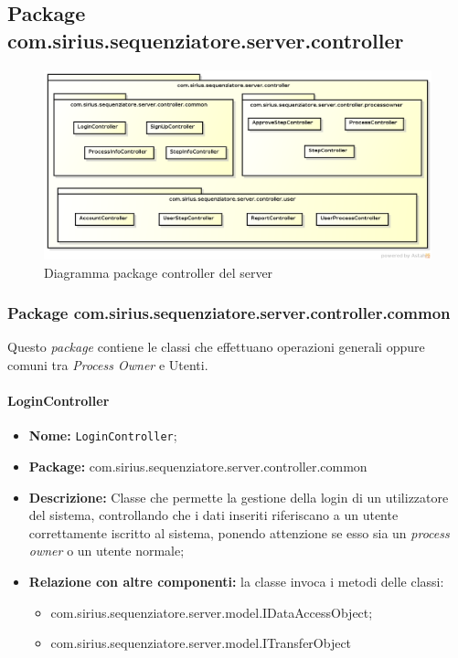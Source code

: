 \subsection{Package com.sirius.sequenziatore.server.controller}
\begin{figure}[H] \centering \includegraphics[width=%
\textwidth]
{./pack/servercontroller.png} \caption{Diagramma package controller del server}
\end{figure}
\subsubsection{Package com.sirius.sequenziatore.server.controller.common}
Questo \textit{package} contiene le classi che effettuano operazioni generali oppure comuni tra \textit{Process Owner} e Utenti.
\paragraph{LoginController}
	\begin{itemize}
		\item \textbf{Nome:} \texttt{LoginController};
		\item \textbf{Package:} com.sirius.sequenziatore.server.controller.common
		\item \textbf{Descrizione:} Classe che permette la gestione della login di un utilizzatore del sistema, controllando che i dati inseriti riferiscano a un utente correttamente iscritto al sistema, ponendo attenzione se esso sia un \textit{process owner} o un utente normale;
		\item \textbf{Relazione con altre componenti:} la classe invoca i metodi delle classi:
		\begin{itemize}
			\item com.sirius.sequenziatore.server.model.IDataAccessObject;
			\item com.sirius.sequenziatore.server.model.ITransferObject
		\end{itemize}
	\end{itemize}
	
